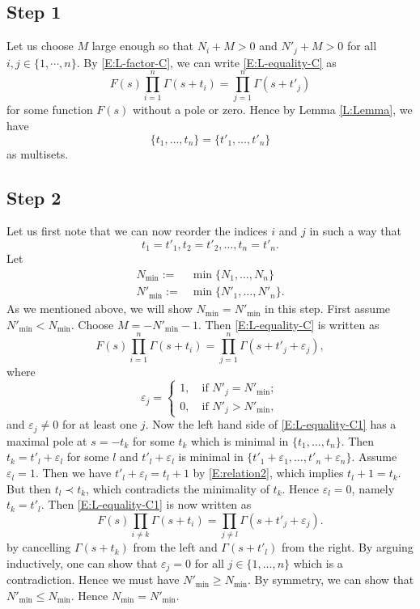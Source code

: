 \documentclass[11pt]{amsart}
\theoremstyle{plain}
\theoremstyle{definition}
\numberwithin{equation}{section}
\newcommand{\ep}{\varepsilon}
\begin{document}
\subsection{Step 1}
Let us choose $M$ large enough so that $N_i+M> 0$ and
$N'_j+M>0$
for all $i, j\in\{1,\cdots,n\}$. By \eqref{E:L-factor-C}, we can write
\eqref{E:L-equality-C} as
\[
F(s)\prod_{i=1}^n\Gamma(s+t_i)=\prod_{j=1}^n\Gamma(s+t'_j)
\]
for some function $F(s)$ without a pole or zero. Hence by Lemma
\ref{L:Lemma}, we have
\[
\{t_1,\dots, t_n\}=\{t'_1,\dots, t'_n\}
\]
as multisets. 

\subsection{Step 2}
Let us first note that we can now reorder the indices $i$
and $j$ in such a way that
\begin{equation}\label{E:relation2}
t_1=t'_1, t_2=t'_2,\dots, t_n=t'_n.
\end{equation}
Let
\begin{align*}
N_{\min}:=&\min\{N_1,\dots,N_n\}\\
N'_{\min}:=&\min\{N'_1,\dots,N'_n\}.
\end{align*}
As we mentioned above, we will show $N_{\min}=N'_{\min}$ in this step. 
First assume $N'_{\min}<N_{\min}$. Choose
$M=-N'_{\min}-1$. Then \eqref{E:L-equality-C} is written as
\begin{equation}\label{E:L-equality-C1}
F(s)\prod_{i=1}^n\Gamma(s+t_i)=\prod_{j=1}^n\Gamma(s+t'_j+\ep_j),
\end{equation}
where 
\[
\ep_j=\begin{cases}1,\quad\text{if $N'_j=N'_{\min}$};\\
0,\quad\text{if $N'_j>N'_{\min}$},
\end{cases}
\]
and $\ep_j\neq 0$ for at least one $j$.
Now the left hand side of \eqref{E:L-equality-C1} has a maximal pole
at $s=-t_k$ for some $t_k$ which is minimal in
$\{t_1,\dots,t_n\}$. Then $t_k=t'_l+\ep_l$ for some $l$ and
$t'_l+\ep_l$ is minimal in
$\{t'_1+\ep_1,\dots,t'_n+\ep_n\}$. Assume $\ep_l=1$. Then we have
$t'_l+\ep_l=t_l+1$ by \eqref{E:relation2}, which implies
$t_l+1=t_k$. But then $t_l\prec t_k$, which
contradicts the minimality of $t_k$. Hence
$\ep_l=0$, namely $t_k=t'_l$. Then
\eqref{E:L-equality-C1} is now written as
\begin{equation}\label{E:L-equality-C2}
F(s)\prod_{i\neq k}\Gamma(s+t_i)=\prod_{j\neq l}\Gamma(s+t'_j+\ep_j).
\end{equation}
by cancelling $\Gamma (s+t_k)$ from the left and $\Gamma (s+t'_l)$ from
the right. By arguing inductively, one can
show that $\ep_j=0$ for all $j\in\{1,\dots,n\}$ which is a
contradiction. Hence we must have $N'_{\min}\geq N_{\min}$. By
symmetry, we can show that $N'_{\min}\leq N_{\min}$. Hence
$N_{\min}=N'_{\min}$.
\end{document}
